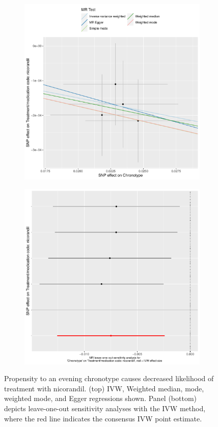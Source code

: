 \documentclass{article}
\begin{document}
% 
\begin{figure}[htbp]
\begin{subfigure}{\linewidth}
\centering
	\includegraphics[width=.8\linewidth]{Figs/Analysis2/Chronotype_vs_Treatment_medication_code_nicorandil.Scatterplots.pdf}
\label{nicScatter}
\end{subfigure}
\begin{subfigure}{\linewidth}
\centering
	\includegraphics[width=.8\linewidth,keepaspectratio]{Figs/Analysis2/Chronotype_vs_Treatment_medication_code_nicorandil.LOOplots.pdf}
\label{nicLoo}
\end{subfigure}
\caption{Propensity to an evening chronotype causes decreased likelihood of treatment with nicorandil. (top) IVW, Weighted median, mode, weighted mode, and Egger regressions shown. Panel (bottom) depicts leave-one-out sensitivity analyses with the IVW method, where the red line indicates the consensus IVW point estimate.}
\label{nic}
\end{figure}
\end{document}
